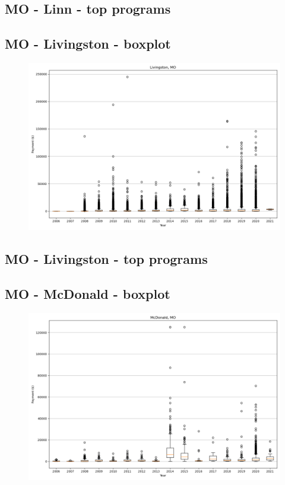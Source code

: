 \subsection*{MO - Linn - top programs}

\newpage
\subsection*{MO - Livingston - boxplot}
\begin{figure}[h]
\centering
\includegraphics[width=7in]{../output/boxplots/counties/Livingston-MO_boxplot.png}
\end{figure}


\subsection*{MO - Livingston - top programs}

\newpage
\subsection*{MO - McDonald - boxplot}
\begin{figure}[h]
\centering
\includegraphics[width=7in]{../output/boxplots/counties/McDonald-MO_boxplot.png}
\end{figure}


